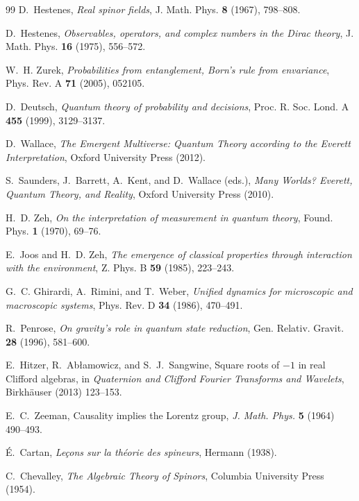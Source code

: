 \documentclass[11pt]{article}
\theoremstyle{definition}
\begin{document}
\begin{thebibliography}{99}
D.~Hestenes,
\emph{Real spinor fields},
J. Math. Phys. \textbf{8} (1967), 798--808.

D.~Hestenes,
\emph{Observables, operators, and complex numbers in the Dirac theory},
J. Math. Phys. \textbf{16} (1975), 556--572.

W.~H. Zurek,
\emph{Probabilities from entanglement, Born's rule from envariance},
Phys. Rev. A \textbf{71} (2005), 052105.

D.~Deutsch,
\emph{Quantum theory of probability and decisions},
Proc. R. Soc. Lond. A \textbf{455} (1999), 3129--3137.

D.~Wallace,
\emph{The Emergent Multiverse: Quantum Theory according to the Everett Interpretation},
Oxford University Press (2012).

S.~Saunders, J.~Barrett, A.~Kent, and D.~Wallace (eds.),
\emph{Many Worlds? Everett, Quantum Theory, and Reality},
Oxford University Press (2010).

H.~D. Zeh,
\emph{On the interpretation of measurement in quantum theory},
Found. Phys. \textbf{1} (1970), 69--76.

E.~Joos and H.~D. Zeh,
\emph{The emergence of classical properties through interaction with the environment},
Z. Phys. B \textbf{59} (1985), 223--243.

G.~C. Ghirardi, A.~Rimini, and T.~Weber,
\emph{Unified dynamics for microscopic and macroscopic systems},
Phys. Rev. D \textbf{34} (1986), 470--491.

R.~Penrose,
\emph{On gravity's role in quantum state reduction},
Gen. Relativ. Gravit. \textbf{28} (1996), 581--600.

E.~Hitzer, R.~Ab\l{}amowicz, and S.~J.~Sangwine,
Square roots of $-1$ in real Clifford algebras,
in \emph{Quaternion and Clifford Fourier Transforms and Wavelets}, Birkh\"auser (2013) 123--153.

E.~C.~Zeeman,
Causality implies the Lorentz group,
\emph{J. Math. Phys.} \textbf{5} (1964) 490--493.

\'E.~Cartan,
\emph{Le\c{c}ons sur la th\'eorie des spineurs},
Hermann (1938).

C.~Chevalley,
\emph{The Algebraic Theory of Spinors},
Columbia University Press (1954).


\end{thebibliography}
\end{document}
